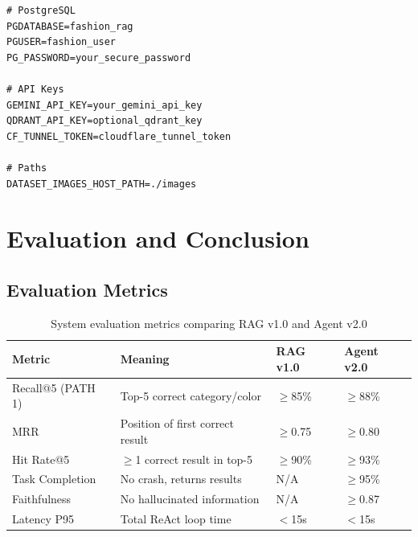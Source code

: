 \documentclass[12pt, twoside]{report}
\begin{document}
\begin{lstlisting}[caption={Environment variables (.env)}]
# PostgreSQL
PGDATABASE=fashion_rag
PGUSER=fashion_user
PG_PASSWORD=your_secure_password

# API Keys
GEMINI_API_KEY=your_gemini_api_key
QDRANT_API_KEY=optional_qdrant_key
CF_TUNNEL_TOKEN=cloudflare_tunnel_token

# Paths
DATASET_IMAGES_HOST_PATH=./images
\end{lstlisting}

\chapter{Evaluation and Conclusion}

\section{Evaluation Metrics}

\begin{table}[H]
\centering
\begin{tabular}{llll}
\toprule
\textbf{Metric} & \textbf{Meaning} & \textbf{RAG v1.0} & \textbf{Agent v2.0}\\
\midrule
Recall@5 (PATH 1)   & Top-5 correct category/color   & $\geq$85\% & $\geq$88\%\\
MRR                 & Position of first correct result & $\geq$0.75 & $\geq$0.80\\
Hit Rate@5          & $\geq$1 correct result in top-5 & $\geq$90\% & $\geq$93\%\\
Task Completion     & No crash, returns results       & N/A         & $\geq$95\%\\
Faithfulness        & No hallucinated information     & N/A         & $\geq$0.87\\
Latency P95         & Total ReAct loop time           & $<$15s      & $<$15s\\
\bottomrule
\end{tabular}
\caption{System evaluation metrics comparing RAG v1.0 and Agent v2.0}
\end{table}
\end{document}
